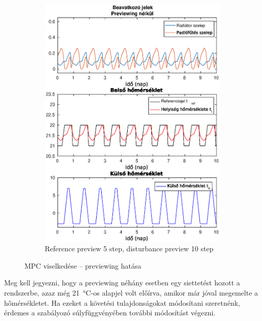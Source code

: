 \begin{figure}[H]
\begin{subfigure}[t]{0.32\textwidth}
		\includegraphics[trim=0 0 0 27, clip,width=\textwidth]{figures/onlab/compare/A_C_P5D10}
		\caption{Reference preview 5 step, disturbance preview 10 step}
		\label{fig:mpc-pr5d10}
	\end{subfigure}
	\caption{MPC viselkedése -- previewing hatása}
	\label{fig:mpc-previeWeight}
\end{figure}


Meg kell jegyezni, hogy a previewing néhány esetben egy siettetést hozott a rendszerbe, azaz még \SI{21}{\celsius}-os alapjel volt előírva, amikor már jóval megemelte a hőmérsékletet. Ha ezeket a követési tulajdonságokat módosítani szeretnénk, érdemes a szabályozó súlyfüggvényében további módosítást végezni.


